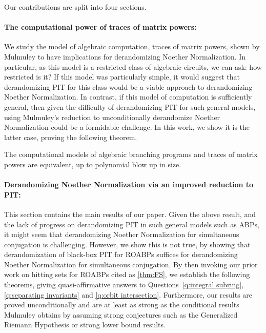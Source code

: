 \documentclass[letterpaper,11pt]{article}
\numberwithin{equation}{section}
\theoremstyle{plain}
\theoremstyle{remark}
\begin{document}
Our contributions are split into four sections.

\paragraph{The computational power of traces of matrix powers:} We study the model of algebraic computation, traces of matrix powers, shown by Mulmuley to have implications for derandomizing Noether Normalization.  In particular, as this model is a restricted class of algebraic circuits, we can ask: how restricted is it?  If this model was particularly simple, it would suggest that derandomizing PIT for this class would be a viable approach to derandomizing Noether Normalization.  In contrast, if this model of computation is sufficiently general, then given the difficulty of derandomizing PIT for such general models, using Mulmuley's reduction to unconditionally derandomize Noether Normalization could be a formidable challenge. In this work, we show it is the latter case, proving the following theorem.

\begin{theorem*}
	The computational models of algebraic branching programs and traces of matrix powers are equivalent, up to polynomial blow up in size.
\end{theorem*}

\paragraph{Derandomizing Noether Normalization via an improved reduction to PIT:} This section contains the main results of our paper. Given the above result, and the lack of progress on derandomizing PIT in such general models such as ABPs, it might seem that derandomizing Noether Normalization for simultaneous conjugation is challenging.  However, we show this is not true, by showing that derandomization of black-box PIT for ROABPs suffices for derandomizing Noether Normalization for simultaneous conjugation.  By then invoking our prior work on hitting sets for ROABPs cited as \autoref{thm:FS}, we establish the following theorems, giving quasi-affirmative answers to Questions~\ref{q:integral subring}, \ref{q:separating invariants} and \ref{q:orbit intersection}. Furthermore, our results are proved unconditionally and are at least as strong as the conditional results Mulmuley obtains by assuming strong conjectures such as the Generalized Riemann Hypothesis or strong lower bound results.
\end{document}
